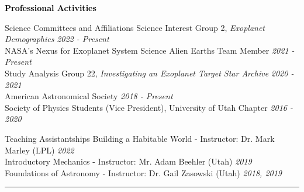 \documentclass{resume} %
\newcommand{\mystrut}{\rule[-.3\baselineskip]{0pt}{\baselineskip}}
\newcommand{\cvline}[1]{\vspace*{\dimexpr-\parskip-0.3\baselineskip}\noindent\rule{\textwidth}{0.4pt}\vspace*{\dimexpr-0.3\parskip-0\baselineskip}}
\renewenvironment{rSection}[1]{\mystrut{\textcolor{black}{{\large{\textbf{#1}}}}}
\vspace{-5pt} %
\begin{list}{}{
\setlength{\leftmargin}{0em}
}
\item[]
}{
\end{list}
}
\begin{document}
\begin{rSection}{Professional Activities} 
\begin{rSubsection}{Science Committees and Affiliations}{}{}{}
{Science Interest Group 2, \textit{Exoplanet Demographics} \hfill {\em 2022 - Present}}\\
{NASA’s Nexus for Exoplanet System Science Alien Earths Team Member \hfill {\em 2021 - Present}}\\
{Study Analysis Group 22, \textit{Investigating an Exoplanet Target Star Archive} \hfill {\em 2020 - 2021}}\\
{American Astronomical Society \hfill {\em 2018 - Present}}\\
{Society of Physics Students (Vice President), University of Utah Chapter \hfill {\em 2016 - 2020}}
\end{rSubsection} 
\begin{rSubsection}{Teaching Assistantships}{}{}{}
{Building a Habitable World - Instructor: Dr. Mark Marley (LPL) \hfill {\em 2022}}\\
{Introductory Mechanics - Instructor: Mr. Adam Beehler (Utah) \hfill {\em 2019}}\\
{Foundations of Astronomy - Instructor: Dr. Gail Zasowski (Utah) \hfill {\em 2018, 2019}}
\end{rSubsection}
\end{rSection}
\cvline{}




\end{document}
